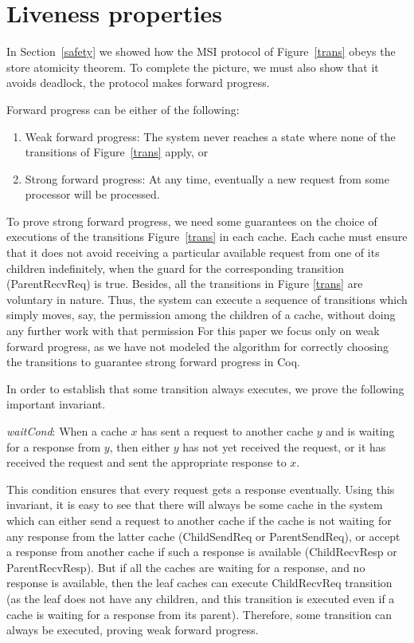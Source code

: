 \section{Liveness properties}
\label{liveness}

In Section~\ref{safety} we showed how the MSI protocol of Figure~\ref{trans}
obeys the store atomicity theorem. To complete the picture, we must also show
that it avoids deadlock, \ie{} the protocol makes forward progress.

Forward progress can be either of the following:
\begin{enumerate}
\item Weak forward progress: The system never reaches a state where
  none of the transitions of Figure~\ref{trans} apply, or
\item Strong forward progress: At any time, eventually a new request
  from some processor will be processed.
\end{enumerate}

To prove strong forward progress, we need some guarantees on the choice of
executions of the transitions Figure~\ref{trans} in each cache. Each cache must
ensure that it does not avoid receiving a particular available request from one
of its children indefinitely, when the guard for the corresponding transition
(ParentRecvReq) is true. Besides, all the transitions in Figure \ref{trans} are
voluntary in nature. Thus, the system can execute a sequence of transitions
which simply moves, say, the \Mo{} permission among the children of a cache,
without doing any further work with that permission
For this paper we focus only on weak forward progress, as we have not modeled
the algorithm for correctly choosing the transitions to guarantee strong
forward progress in Coq.

In order to establish that some transition always executes, we prove the
following important invariant.

\begin{inv}
\textit{waitCond}: When a cache $x$ has sent a request to another cache $y$ and
is waiting for a response from $y$, then either $y$ has not yet received the
request, or it has received the request and sent the appropriate response to
$x$.
\end{inv}

This condition ensures that every request gets a response eventually. Using
this invariant, it is easy to see that there will always be some cache in the
system which can either send a request to another cache if the cache is not
waiting for any response from the latter cache (ChildSendReq or ParentSendReq),
or accept a response from another cache if such a response is available
(ChildRecvResp or ParentRecvResp). But if all the caches are waiting for a
response, and no response is available, then the leaf caches can execute
ChildRecvReq transition (as the leaf does not have any children, and this
transition is executed even if a cache is waiting for a response from its
parent). Therefore, some transition can always be executed, proving weak
forward progress.
